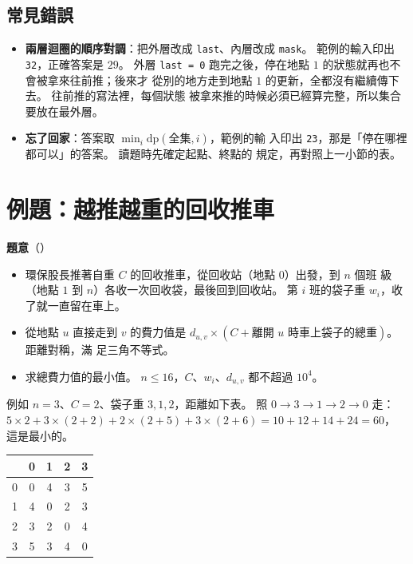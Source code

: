 \subsection{常見錯誤}

\begin{itemize}
\item \textbf{兩層迴圈的順序對調}：把外層改成 \texttt{last}、內層改成
\texttt{mask}。 範例的輸入印出 \texttt{32}，正確答案是 $29$。 外層
\texttt{last = 0} 跑完之後，停在地點 $1$ 的狀態就再也不會被拿來往前推；後來才
從別的地方走到地點 $1$ 的更新，全都沒有繼續傳下去。 往前推的寫法裡，每個狀態
被拿來推的時候必須已經算完整，所以集合要放在最外層。
\item \textbf{忘了回家}：答案取 $\min_i \mathrm{dp}(\text{全集}, i)$，範例的輸
入印出 \texttt{23}，那是「停在哪裡都可以」的答案。 讀題時先確定起點、終點的
規定，再對照上一小節的表。
\end{itemize}

\section{例題：越推越重的回收推車}
\label{sec:ex-bm-cart}

\textbf{題意}（）

\begin{itemize}
\item 環保股長推著自重 $C$ 的回收推車，從回收站（地點 $0$）出發，到 $n$ 個班
級（地點 $1$ 到 $n$）各收一次回收袋，最後回到回收站。 第 $i$ 班的袋子重
$w_i$，收了就一直留在車上。
\item 從地點 $u$ 直接走到 $v$ 的費力值是
$d_{u,v} \times (C + \text{離開 } u \text{ 時車上袋子的總重})$。 距離對稱，滿
足三角不等式。
\item 求總費力值的最小值。 $n \le 16$，$C$、$w_i$、$d_{u,v}$ 都不超過
$10^4$。
\end{itemize}

例如 $n = 3$、$C = 2$、袋子重 $3, 1, 2$，距離如下表。 照
$0 \to 3 \to 1 \to 2 \to 0$ 走：$5 \times 2 + 3 \times (2 + 2) + 2 \times (2 + 5) + 3 \times (2 + 6) = 10 + 12 + 14 + 24 = 60$，
這是最小的。

\begin{center}
\begin{tabular}{c|cccc}
\toprule
 & 0 & 1 & 2 & 3 \\
\midrule
0 & 0 & 4 & 3 & 5 \\
1 & 4 & 0 & 2 & 3 \\
2 & 3 & 2 & 0 & 4 \\
3 & 5 & 3 & 4 & 0 \\
\bottomrule
\end{tabular}
\end{center}

